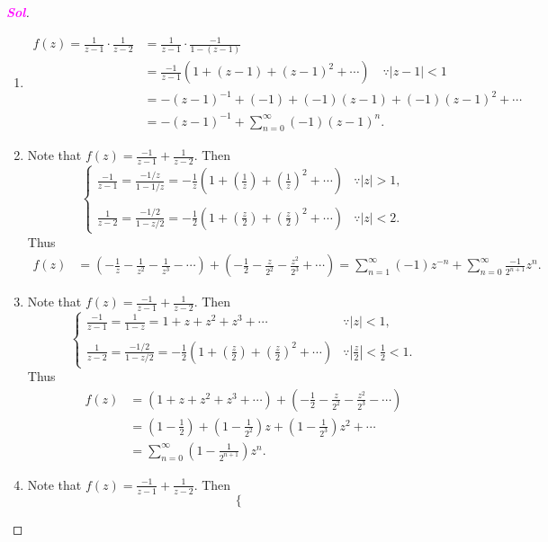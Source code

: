 \documentclass{article}
\theoremstyle{definition}
\newcommand{\of}[1]{\left( #1 \right)}
\newcommand{\abs}[1]{\left\lvert #1 \right\rvert}
\newcommand{\sol}{\textcolor{magenta}{\bf Sol}}
\begin{document}
\begin{proof}[\sol]
	\begin{enumerate}[(1)]
		\item \begin{align*}
			f(z)=\frac{1}{z-1}\cdot\frac{1}{z-2}&=\frac{1}{z-1}\cdot\frac{-1}{1-(z-1)}\\
			&=\frac{-1}{z-1}\of{1+(z-1)+(z-1)^2+\cdots}\quad\because\abs{z-1}<1\\
			&=-(z-1)^{-1}+(-1)+(-1)(z-1)+(-1)(z-1)^2+\cdots\\
			&=-(z-1)^{-1}+\sum_{n=0}^\infty(-1)(z-1)^n.
		\end{align*}
		\item Note that $\displaystyle f(z)=\frac{-1}{z-1}+\frac{1}{z-2}$. Then \[
		\begin{cases}
			\frac{-1}{z-1}=\frac{-1/z}{1-1/z}=-\frac{1}{z}\of{1+\of{\frac{1}{z}}+\of{\frac{1}{z}}^2+\cdots} &\because\abs{z}>1,\\
			\\
			\frac{1}{z-2}=\frac{-1/2}{1-z/2}=-\frac{1}{2}\of{1+\of{\frac{z}{2}}+\of{\frac{z}{2}}^2+\cdots} &\because\abs{z}<2.
		\end{cases}
		\] Thus \begin{align*}
			f(z)&=\of{-\frac{1}{z}-\frac{1}{z^2}-\frac{1}{z^3}-\cdots}+\of{-\frac{1}{2}-\frac{z}{2^2}-\frac{z^2}{2^3}+\cdots}=\sum_{n=1}^\infty(-1)z^{-n}+\sum_{n=0}^\infty\frac{-1}{2^{n+1}}z^n.
		\end{align*}
		\item Note that $\displaystyle f(z)=\frac{-1}{z-1}+\frac{1}{z-2}$. Then \[
		\begin{cases}
			\frac{-1}{z-1}=\frac{1}{1-z}=1+z+z^2+z^3+\cdots &\because\abs{z}<1,\\
			\\
			\frac{1}{z-2}=\frac{-1/2}{1-z/2}=-\frac{1}{2}\of{1+\of{\frac{z}{2}}+\of{\frac{z}{2}}^2+\cdots} &\because\abs{\frac{z}{2}}<\frac{1}{2}<1.
		\end{cases}
		\] Thus \begin{align*}
			f(z)&=\of{1+z+z^2+z^3+\cdots}+\of{-\frac{1}{2}-\frac{z}{2^2}-\frac{z^2}{2^3}-\cdots}\\
			&=\of{1-\frac{1}{2}}+\of{1-\frac{1}{2^2}}z+\of{1-\frac{1}{2^3}}z^2+\cdots\\
			&=\sum_{n=0}^\infty\of{1-\frac{1}{2^{n+1}}}z^n.
		\end{align*}
		\item Note that $\displaystyle f(z)=\frac{-1}{z-1}+\frac{1}{z-2}$. Then \[
		\begin{cases}

\end{cases}\]
\end{enumerate}
\end{proof}
\end{document}
